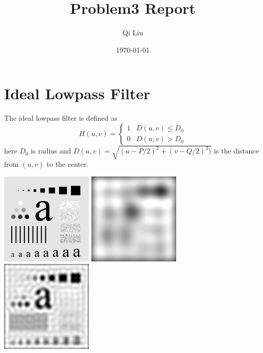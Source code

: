 \documentclass{article}
\title{Problem3 Report}
\author{Qi Liu}
\date{\today}
\begin{document}
\maketitle

\section{Ideal Lowpass Filter}
The ideal lowpass filter is defined as $$H(u,v)=\begin{cases} 1 & D(u,v)\le D_0 \\ 0 & D(u,v)>D_0 \end{cases}$$ here $D_0$ is radius and $D(u,v)=\sqrt{(u-P/2)^2+(v-Q/2)^2)}$ is the distance from $(u,v)$ to the center.

\includegraphics[width=0.33\textwidth]{../data/characters_test_pattern.jpg}
\includegraphics[width=0.33\textwidth]{../data/ideal_lowpass_10_characters_test_pattern.jpg}
\includegraphics[width=0.33\textwidth]{../data/ideal_lowpass_30_characters_test_pattern.jpg}
\end{document}
